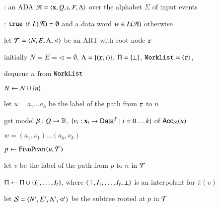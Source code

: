 \documentclass[10pt,conference,letterpaper,twocolumn]{IEEEtran}
\begin{document}
\begin{algorithm}[t!]
{\scriptsize\begin{algorithmic}[0]
: an ADA $\mathcal{A} = \left\langle \mathbf x,Q,\iota,F,\Delta \right\rangle$
over the alphabet $\Sigma$ of input events

: $\mathtt{true}$ if $L(\mathcal{A})=\emptyset$ and a data word $w
\in L(\mathcal{A})$ otherwise
\end{algorithmic}}

{\scriptsize\begin{algorithmic}[1] 

  \State let $\mathcal{T} = \left\langle N,E,\Lambda,\lhd \right\rangle$ be an ART with root
  node $\mathtt{r}$

  \State initially $N = E = \lhd = \emptyset$, $\Lambda =
  \left\{ (\mathtt{r},\iota) \right\}$, $\mathsf{\Pi} = \left\{ \bot \right\}$, $\mathtt{WorkList} =
  \left\langle \mathtt{r} \right\rangle$,

  \While {$\worklist \neq \emptyset$}
  \label{ln:while}
  
  \State dequeue $n$ from $\mathtt{WorkList}$ 

  \State $N \leftarrow N \cup \left\{ n \right\}$

   

  \State let $u = a_1\ldots a_k$ be the label of the path from
  $\mathtt{r}$ to $n$ 

   

  \State get model $\beta : Q \rightarrow \mathbb{B}$, $\{\nu_i :
  \mathbf x_i \rightarrow \mathsf{Data}^{\mathcal{I}} \mid i=0\ldots k\}$ of $\mathsf{Acc}_{\mathcal{A}}(u)$

   $w = (a_1,\nu_1) \ldots (a_k,\nu_k)$
  \label{ln:cex}

  \Else {}

  \State $p \leftarrow \Call{FindPivot}{u,\Art}$
  \label{ln:pivot}

  \State let $v$ be the label of the path from $p$ to $n$ in $\mathcal{T}$
  
  \State $\mathsf{\Pi} \leftarrow \mathsf{\Pi} \cup \left\{ I_1,\ldots,I_\ell \right\}$,
  where $\left\langle \top,I_1,\ldots,I_\ell,\bot \right\rangle$ is an interpolant for
  $\overline{\pi}(v)$

  \State let $\mathcal{S} = \left\langle N',E',\Lambda',\lhd' \right\rangle$ be the subtree
  rooted at $p$ in $\mathcal{T}$



\end{algorithmic}}
\end{algorithm}
\end{document}
